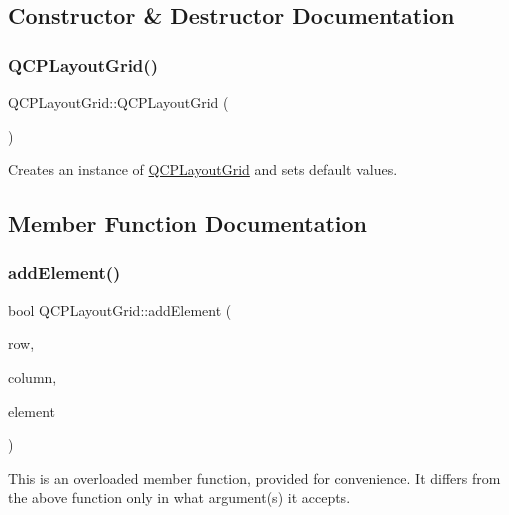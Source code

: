 \subsection{Constructor \& Destructor Documentation}
\mbox{\label{class_q_c_p_layout_grid_ab2a4c1587dc8aed4c41c509c8d8d2a64}} 
\subsubsection{\texorpdfstring{Q\+C\+P\+Layout\+Grid()}{QCPLayoutGrid()}}
{\footnotesize\ttfamily Q\+C\+P\+Layout\+Grid\+::\+Q\+C\+P\+Layout\+Grid (\begin{DoxyParamCaption}{ }\end{DoxyParamCaption})\hspace{0.3cm}{\ttfamily [explicit]}}

Creates an instance of \hyperlink{class_q_c_p_layout_grid}{Q\+C\+P\+Layout\+Grid} and sets default values. 

\subsection{Member Function Documentation}
\mbox{\label{class_q_c_p_layout_grid_adff1a2ca691ed83d2d24a4cd1fe17012}} 
\subsubsection{\texorpdfstring{add\+Element()}{addElement()}\hspace{0.1cm}{\footnotesize\ttfamily [1/2]}}
{\footnotesize\ttfamily bool Q\+C\+P\+Layout\+Grid\+::add\+Element (\begin{DoxyParamCaption}\item[{int}]{row,  }\item[{int}]{column,  }\item[{\hyperlink{class_q_c_p_layout_element}{Q\+C\+P\+Layout\+Element} $\ast$}]{element }\end{DoxyParamCaption})}

This is an overloaded member function, provided for convenience. It differs from the above function only in what argument(s) it accepts.

